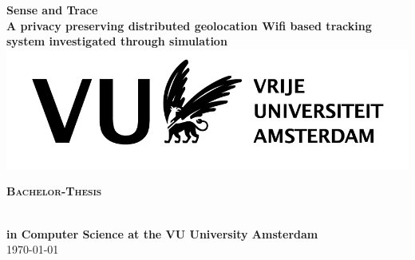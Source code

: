 \documentclass[10pt,titlepage]{article}
\begin{document}
\begin{titlepage}
\thispagestyle{empty}
  \begin{adjustwidth}{-2cm}{-2cm}

    \begin{center}
	    \vspace{2cm}
            \huge \textbf{\textsf{Sense and Trace\\A privacy preserving distributed geolocation Wifi based tracking system investigated through simulation}} \\
            \vspace{1cm}
 \centering
 \includegraphics[width=14cm]{VUlogo_NL_Wit_ZW_HR_RGB_tcm9-231446.png}\\
    \vspace{1cm}


    \begin{Huge}\textbf{\textsc{Bachelor-Thesis}}    \end{Huge}\\
    \vspace{2cm}
    \large \textbf{in Computer Science at the VU University Amsterdam}\\
    \vspace{1cm}
    \normalsize
    \today \\
    \vspace{1cm}
    

\end{center}
\end{adjustwidth}
\end{titlepage}
\end{document}
